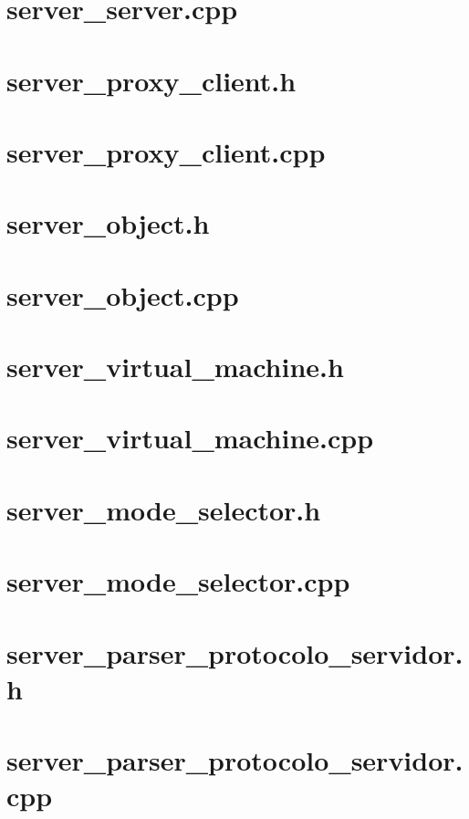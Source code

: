\documentclass{article}
\begin{document}
\section{ server\_server.cpp }

\newpage
\section{ server\_proxy\_client.h }

\newpage
\section{ server\_proxy\_client.cpp }

\newpage
\section{ server\_object.h }

\newpage
\section{ server\_object.cpp }

\newpage
\section{ server\_virtual\_machine.h }

\newpage
\section{ server\_virtual\_machine.cpp }

\newpage
\section{ server\_mode\_selector.h }

\newpage
\section{ server\_mode\_selector.cpp }

\newpage
\section{ server\_parser\_protocolo\_servidor.h }

\newpage
\section{ server\_parser\_protocolo\_servidor.cpp }

\end{document}
